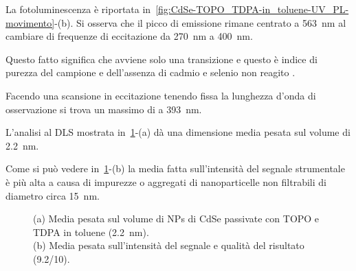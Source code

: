 La fotoluminescenza è riportata in~\ref{fig:CdSe-TOPO_TDPA-in_toluene-UV_PL-movimento}-(b). Si osserva che il picco di emissione rimane centrato a 563~nm al cambiare di frequenze di eccitazione da 270~nm a 400~nm. 

Questo fatto significa che avviene solo una transizione e questo è indice di purezza del campione e dell'assenza di cadmio e selenio non reagito \cite{qd-CdSe-CdCl2}. 

Facendo una scansione in eccitazione tenendo fissa la lunghezza d'onda di osservazione si trova un massimo di a 393~nm.

L'analisi al DLS mostrata in~\ref{fig:AKT146-TOPO.CdSefilter-20100512}-(a) dà una dimensione media pesata sul volume di 2.2~nm.

Come si può vedere in~\ref{fig:AKT146-TOPO.CdSefilter-20100512}-(b) la media fatta sull'intensità del segnale strumentale è più alta a causa di impurezze o aggregati di nanoparticelle non filtrabili di diametro circa 15~nm.
\begin{figure}[!htb]
\caption{\footnotesize{(a) Media pesata sul volume di NPs di CdSe passivate con TOPO e TDPA in toluene (2.2~nm). \\(b) Media pesata sull'intensità del segnale e qualità del risultato (9.2/10).}}
\label{fig:AKT146-TOPO.CdSefilter-20100512}
\end{figure}


